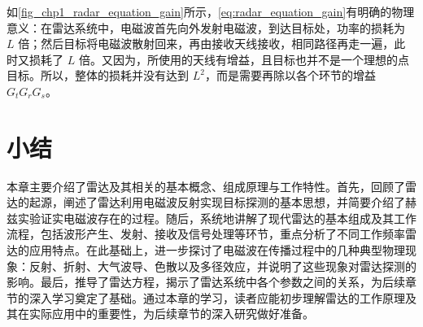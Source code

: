 如\cref{fig_chp1_radar_equation_gain}所示，\cref{eq:radar_equation_gain}有明确的物理意义：在雷达系统中，电磁波首先向外发射电磁波，到达目标处，功率的损耗为 $L$ 倍；然后目标将电磁波散射回来，再由接收天线接收，相同路径再走一遍，此时又损耗了 $L$ 倍。又因为，所使用的天线有增益，且目标也并不是一个理想的点目标。所以，整体的损耗并没有达到 $L^2$，而是需要再除以各个环节的增益 $G_t G_r G_s$。


\section{小结}

本章主要介绍了雷达及其相关的基本概念、组成原理与工作特性。首先，回顾了雷达的起源，阐述了雷达利用电磁波反射实现目标探测的基本思想，并简要介绍了赫兹实验证实电磁波存在的过程。随后，系统地讲解了现代雷达的基本组成及其工作流程，包括波形产生、发射、接收及信号处理等环节，重点分析了不同工作频率雷达的应用特点。在此基础上，进一步探讨了电磁波在传播过程中的几种典型物理现象：反射、折射、大气波导、色散以及多径效应，并说明了这些现象对雷达探测的影响。最后，推导了雷达方程，揭示了雷达系统中各个参数之间的关系，为后续章节的深入学习奠定了基础。通过本章的学习，读者应能初步理解雷达的工作原理及其在实际应用中的重要性，为后续章节的深入研究做好准备。